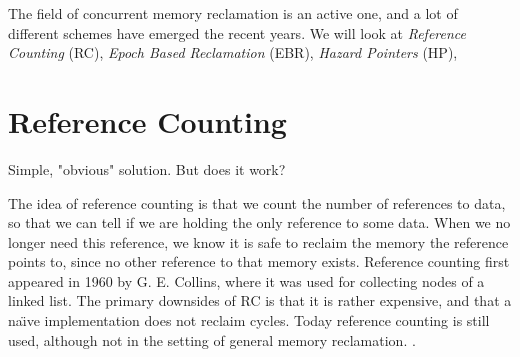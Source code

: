 \documentclass[b5paper,twoside]{report}
\begin{document}
The field of concurrent memory reclamation is an active one, and a lot of different schemes
have emerged the recent years. We will look at
\emph{Reference Counting} (RC),
\emph{Epoch Based Reclamation} (EBR),
\emph{Hazard Pointers} (HP),




\section{Reference Counting}
Simple, "obvious" solution. But does it work?

The idea of reference counting is that we count the number of references to data,
so that we can tell if we are holding the only reference to some data.
When we no longer need this reference, we know it is safe to reclaim the memory
the reference points to, since no other reference to that memory exists.
Reference counting first appeared in 1960 by G. E. Collins\cite{collins1960method},
where it was used for collecting nodes of a linked list.
The primary downsides of RC is that it is rather expensive, and that a na\"\i{}ve
implementation does not reclaim cycles.
Today reference counting is still used, although not in the setting of general
memory reclamation. 
.

%
\end{document}

